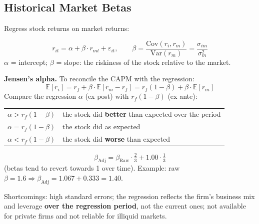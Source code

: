 \subsection{Historical Market Betas}
Regress stock returns on market returns:
\begin{keybox}
\[
r_{it}=\alpha+\beta\cdot r_{mt}+\varepsilon_{it},\qquad \beta=\frac{\text{Cov}(r_i,r_m)}{\text{Var}(r_m)}=\frac{\sigma_{im}}{\sigma_m^2}
\]
$\alpha$ = intercept; $\beta$ = slope: the riskiness of the stock relative to the market.
\end{keybox}
\textbf{Jensen's alpha.} To reconcile the CAPM with the regression:
\[
\mathbb{E}[r_i]=r_f+\beta\cdot\mathbb{E}[r_m-r_f]=r_f(1-\beta)+\beta\cdot\mathbb{E}[r_m]
\]
Compare the regression $\alpha$ (ex post) with $r_f(1-\beta)$ (ex ante):
\begin{center}
\begin{tabular}{@{}ll@{}}
\toprule
$\alpha>r_f(1-\beta)$ & the stock did \textbf{better} than expected over the period\\
$\alpha=r_f(1-\beta)$ & the stock did as expected\\
$\alpha<r_f(1-\beta)$ & the stock did \textbf{worse} than expected\\
\bottomrule
\end{tabular}
\end{center}
\begin{keybox}
\[
\beta_{\text{Adj}}=\beta_{\text{Raw}}\cdot\tfrac{2}{3}+1.00\cdot\tfrac{1}{3}
\]
(betas tend to revert towards 1 over time). Example: raw $\beta=1.6\Rightarrow\beta_{\text{Adj}}=1.067+0.333=1.40$.
\end{keybox}
Shortcomings: high standard errors; the regression reflects the firm's business mix and leverage \textbf{over the regression period}, not the current ones; not available for private firms and not reliable for illiquid markets.

